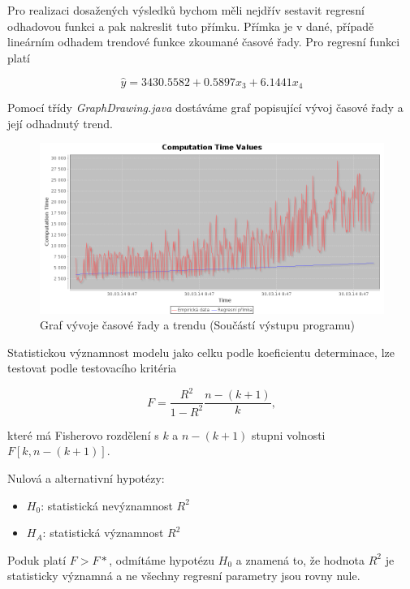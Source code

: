 \documentclass[a4paper,12pt,twoside]{scrreprt}
\begin{document}
Pro realizaci dosažených výsledků bychom měli nejdřív sestavit regresní odhadovou funkci a pak nakreslit tuto přímku. Přímka je v dané, případě lineárním odhadem trendové funkce zkoumané časové řady. Pro regresní funkci platí

\begin{equation}
\hat{y} = 3430.5582 + 0.5897x_3 + 6.1441x_4
\end{equation}

Pomocí třídy \textit{GraphDrawing.java} dostáváme graf popisující vývoj časové řady a její odhadnutý trend.

\begin{figure}[h]
  \centering
  \includegraphics[width=15cm]{pictures/regresniFunkce.png}
  \caption{Graf vývoje časové řady a trendu \newline(Součástí výstupu programu)}
  \label{fig:regrese}
\end{figure}

Statistickou významnost modelu jako celku podle koeficientu determinace, lze testovat podle testovacího kritéria 

\begin{equation}
F = \frac{R^2}{1 - R^2}\frac{n-(k+1)}{k},
\end{equation}

které má Fisherovo rozdělení s $k$ a $n-(k+1)$ stupni volnosti $F[k, n-(k+1)]$. 

\newpage
Nulová a alternativní hypotézy:

\begin{itemize}
\item $H_0$: statistická nevýznamnost $R^2$
\item $H_A$: statistická významnost $R^2$
\end{itemize} 

Poduk platí $F > F*$, odmítáme hypotézu $H_0$ a znamená to, že hodnota $R^2$ je statisticky významná a ne všechny regresní parametry jsou rovny nule. 
\end{document}
